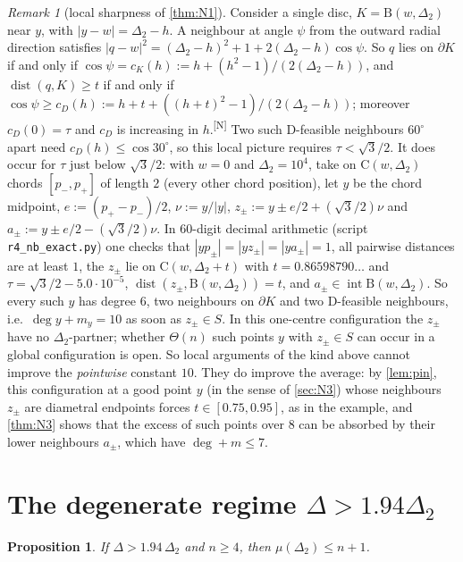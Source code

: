 \documentclass[11pt]{amsart}
\newtheorem{proposition}[theorem]{Proposition}
\theoremstyle{definition}
\theoremstyle{remark}
\newtheorem{remark}[theorem]{Remark}
\newcommand{\Dt}{\Delta_2}
\newcommand{\mult}{\mu}
\newcommand{\dist}{\operatorname{dist}}
\newcommand{\Cc}{\mathrm{C}}      %
\newcommand{\Dd}{\mathrm{B}}      %
\newcommand{\chk}[1]{\textsuperscript{[#1]}}
\begin{document}
\begin{remark}[local sharpness of \cref{thm:N1}]\label{rem:sharp}
Consider a single disc, $K=\Dd(w,\Dt)$ near $y$, with $|y-w|=\Dt-h$. A neighbour at angle $\psi$ from the outward radial direction satisfies $|q-w|^2=(\Dt-h)^2+1+2(\Dt-h)\cos\psi$. So $q$ lies on $\partial K$ if and only if $\cos\psi=c_K(h):=h+(h^2-1)/(2(\Dt-h))$, and $\dist(q,K)\ge t$ if and only if $\cos\psi\ge c_D(h):=h+t+((h+t)^2-1)/(2(\Dt-h))$; moreover $c_D(0)=\tau$ and $c_D$ is increasing in $h$.\chk{N} Two such D-feasible neighbours $60^\circ$ apart need $c_D(h)\le\cos30^\circ$, so this local picture requires $\tau<\sqrt3/2$. It does occur for $\tau$ just below $\sqrt3/2$: with $w=0$ and $\Dt=10^4$, take on $\Cc(w,\Dt)$ chords $[p_-,p_+]$ of length $2$ (every other chord position), let $y$ be the chord midpoint, $e:=(p_+-p_-)/2$, $\nu:=y/|y|$, $z_\pm:=y\pm e/2+(\sqrt3/2)\nu$ and $a_\pm:=y\pm e/2-(\sqrt3/2)\nu$. In $60$-digit decimal arithmetic (script \texttt{r4\_nb\_exact.py}) one checks that $|yp_\pm|=|yz_\pm|=|ya_\pm|=1$, all pairwise distances are at least $1$, the $z_\pm$ lie on $\Cc(w,\Dt+t)$ with $t=0.86598790\ldots$ and $\tau=\sqrt3/2-5.0\cdot10^{-5}$, $\dist(z_\pm,\Dd(w,\Dt))=t$, and $a_\pm\in\operatorname{int}\Dd(w,\Dt)$. So every such $y$ has degree $6$, two neighbours on $\partial K$ and two D-feasible neighbours, i.e.\ $\deg y+m_y=10$ as soon as $z_\pm\in S$. In this one-centre configuration the $z_\pm$ have no $\Dt$-partner; whether $\Theta(n)$ such points $y$ with $z_\pm\in S$ can occur in a global configuration is open. So local arguments of the kind above cannot improve the \emph{pointwise} constant $10$. They do improve the average: by \cref{lem:pin}, this configuration at a good point $y$ (in the sense of \cref{sec:N3}) whose neighbours $z_\pm$ are diametral endpoints forces $t\in[0.75,0.95]$, as in the example, and \cref{thm:N3} shows that the excess of such points over $8$ can be absorbed by their lower neighbours $a_\pm$, which have $\deg+m\le7$.
\end{remark}
\section{The degenerate regime \texorpdfstring{$\Delta>1.94\Dt$}{Delta > 1.94 Delta2}}\label{sec:degenerate}

\begin{proposition}\label{prop:degenerate}
If $\Delta>1.94\,\Dt$ and $n\ge4$, then $\mult(\Dt)\le n+1$.
\end{proposition}
\end{document}
